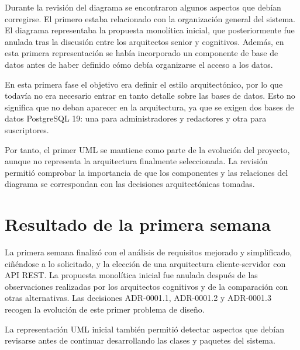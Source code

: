 Durante la revisión del diagrama se encontraron algunos aspectos que debían corregirse. El primero estaba relacionado con la organización general del sistema. El diagrama representaba la propuesta monolítica inicial, que posteriormente fue anulada tras la discusión entre los arquitectos senior y cognitivos. Además, en esta primera representación se había incorporado un componente de base de datos antes de haber definido cómo debía organizarse el acceso a los datos.

En esta primera fase el objetivo era definir el estilo arquitectónico, por lo que todavía no era necesario entrar en tanto detalle sobre las bases de datos. Esto no significa que no deban aparecer en la arquitectura, ya que se exigen dos bases de datos PostgreSQL 19: una para administradores y redactores y otra para suscriptores.

Por tanto, el primer UML se mantiene como parte de la evolución del proyecto, aunque no representa la arquitectura finalmente seleccionada. La revisión permitió comprobar la importancia de que los componentes y las relaciones del diagrama se correspondan con las decisiones arquitectónicas tomadas.

\section{Resultado de la primera semana}

La primera semana finalizó con el análisis de requisitos mejorado y simplificado, ciñéndose a lo solicitado, y la elección de una arquitectura cliente-servidor con API REST. La propuesta monolítica inicial fue anulada después de las observaciones realizadas por los arquitectos cognitivos y de la comparación con otras alternativas. Las decisiones ADR-0001.1, ADR-0001.2 y ADR-0001.3 recogen la evolución de este primer problema de diseño.

La representación UML inicial también permitió detectar aspectos que debían revisarse antes de continuar desarrollando las clases y paquetes del sistema.
